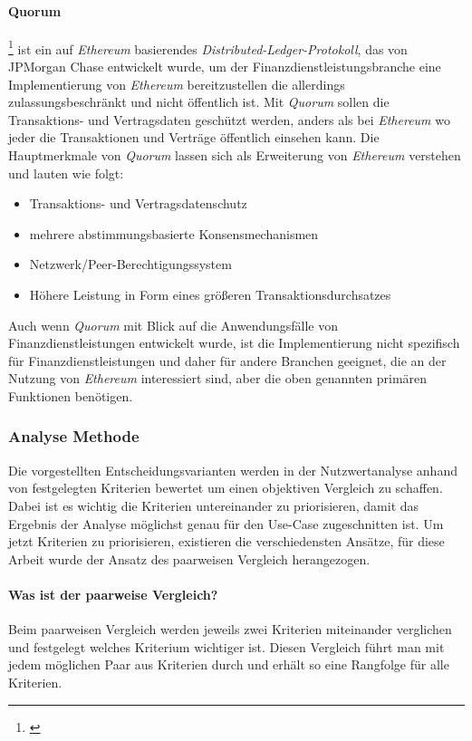 \paragraph{Quorum}\footnote{\citet{Chase2016}}
ist ein auf \textit{Ethereum} basierendes \textit{Distributed-Ledger-Protokoll}, das von JPMorgan Chase entwickelt wurde, um der Finanzdienstleistungsbranche eine Implementierung von \textit{Ethereum} bereitzustellen die allerdings zulassungsbeschränkt und nicht öffentlich ist. Mit \textit{Quorum} sollen die Transaktions- und Vertragsdaten geschützt werden, anders als bei \textit{Ethereum} wo jeder die Transaktionen und Verträge öffentlich einsehen kann. Die Hauptmerkmale von \textit{Quorum} lassen sich als Erweiterung von \textit{Ethereum} verstehen und lauten wie folgt:

\begin{itemize}
	\item Transaktions- und Vertragsdatenschutz
	\item mehrere abstimmungsbasierte Konsensmechanismen
	\item Netzwerk/Peer-Berechtigungssystem
	\item Höhere Leistung in Form eines größeren Transaktionsdurchsatzes
\end{itemize}

Auch wenn \textit{Quorum} mit Blick auf die Anwendungsfälle von Finanzdienstleistungen entwickelt wurde, ist die Implementierung nicht spezifisch für Finanzdienstleistungen und daher für andere Branchen geeignet, die an der Nutzung von \textit{Ethereum} interessiert sind, aber die oben genannten primären Funktionen benötigen.

\subsubsection{Analyse Methode}
Die vorgestellten Entscheidungsvarianten werden in der Nutzwertanalyse anhand von festgelegten Kriterien bewertet um einen objektiven Vergleich zu schaffen. Dabei ist es wichtig die Kriterien untereinander zu priorisieren, damit das Ergebnis der Analyse möglichst genau für den Use-Case zugeschnitten ist. Um jetzt Kriterien zu priorisieren, existieren die verschiedensten Ansätze, für diese Arbeit wurde der Ansatz des paarweisen Vergleich herangezogen.

\paragraph{Was ist der paarweise Vergleich?}
Beim paarweisen Vergleich werden jeweils zwei Kriterien miteinander verglichen und festgelegt welches Kriterium wichtiger ist. Diesen Vergleich führt man mit jedem möglichen Paar aus Kriterien durch und erhält so eine Rangfolge für alle Kriterien.

